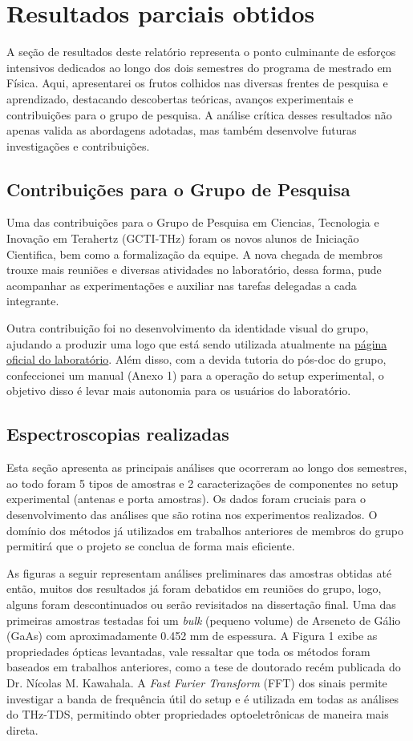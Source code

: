 \documentclass[a4paper,12pt,oneside]{article}
\begin{document}
\section{Resultados parciais obtidos}
\qquad A seção de resultados deste relatório representa o ponto culminante de esforços intensivos dedicados ao longo dos dois semestres do programa de mestrado em Física. Aqui, apresentarei os frutos colhidos nas diversas frentes de pesquisa e aprendizado, destacando descobertas teóricas, avanços experimentais e contribuições para o grupo de pesquisa. A análise crítica desses resultados não apenas valida as abordagens adotadas, mas também desenvolve futuras investigações e contribuições.

\subsection{Contribuições para o Grupo de Pesquisa}
\qquad Uma das contribuições para o Grupo de Pesquisa em Ciencias, Tecnologia e Inovação em Terahertz (GCTI-THz) foram os novos alunos de Iniciação Cientifica, bem como a formalização da equipe. A nova chegada de membros trouxe mais reuniões e diversas atividades no laboratório, dessa forma, pude acompanhar as experimentações e auxiliar nas tarefas delegadas a cada integrante. 

Outra contribuição foi no desenvolvimento da identidade visual do grupo, ajudando a produzir uma logo que está sendo utilizada atualmente na \href{https://portal.if.usp.br/terahertz/node/323}{página oficial do laboratório}. Além disso, com a devida tutoria do pós-doc do grupo, confeccionei um manual (Anexo 1) para a operação do setup experimental, o objetivo disso é levar mais autonomia para os usuários do laboratório. 

\subsection{Espectroscopias realizadas}
\qquad Esta seção apresenta as principais análises que ocorreram ao longo dos semestres, ao todo foram 5 tipos de amostras e 2 caracterizações de componentes no setup experimental (antenas e porta amostras). Os dados foram cruciais para o desenvolvimento das análises que são rotina nos experimentos realizados. O domínio dos métodos já utilizados em trabalhos anteriores de membros do grupo \cite{Nicolas2023} permitirá que o projeto se conclua de forma mais eficiente. 

As figuras a seguir representam análises preliminares das amostras obtidas até então, muitos dos resultados já foram debatidos em reuniões do grupo, logo, alguns foram descontinuados ou serão revisitados na dissertação final. Uma das primeiras amostras testadas foi um \textit{bulk} (pequeno volume) de Arseneto de Gálio (GaAs) com aproximadamente 0.452 mm de espessura. A Figura 1 exibe as propriedades ópticas levantadas, vale ressaltar que toda os métodos foram baseados em trabalhos anteriores, como a tese de doutorado recém publicada do Dr. Nícolas M. Kawahala. A \textit{Fast Furier Transform} (FFT) dos sinais permite investigar a banda de frequência útil do setup e é utilizada em todas as análises do THz-TDS, permitindo obter propriedades optoeletrônicas de maneira mais direta.
\end{document}
